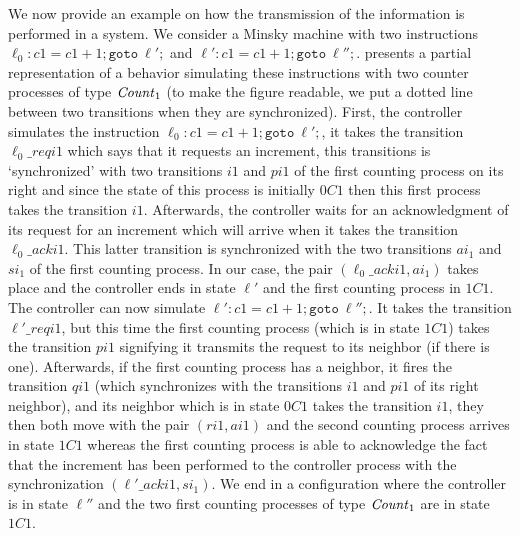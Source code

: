 We now provide an example on how the transmission of the information is performed in a system.
We consider a Minsky machine with two instructions
$\ell_0:c1=c1+1;\mathtt{goto}~\ell';$ and $\ell':c1=c1+1;\mathtt{goto}~\ell'';$.
 presents a partial representation of a behavior simulating these instructions
with two counter processes of type $\mathit{Count}_1$
(to make the figure readable, we put a dotted line between two transitions when they are synchronized).
First, the  controller simulates the instruction $\ell_0:c1=c1+1;\mathtt{goto}~\ell';$,
it takes the transition $\ell_0\_reqi1$ which says that it requests an increment,
this transitions is `synchronized' with two transitions $i1$ and $pi1$ of the first counting process
on its right and since the state of this process is initially $0C1$
then this first process takes the transition $i1$.
Afterwards, the controller waits for an acknowledgment of its request for an increment
which will arrive when it takes the transition $\ell_0\_acki1$.
This latter transition is synchronized with the two transitions $ai_1$ and $si_1$
of the first counting process.
In our case, the pair $(\ell_0\_acki1,ai_1)$ takes place and the controller ends in state $\ell'$
and the first counting process in $1C1$.
The controller can now simulate $\ell':c1=c1+1;\mathtt{goto}~\ell'';$.
It takes the transition $\ell'\_reqi1$, but this time the first counting process (which is in state $1C1$)
takes the transition $pi1$ signifying it transmits the request to its neighbor (if there is one).
Afterwards, if the first counting process has a neighbor, it  fires the transition $qi1$
(which synchronizes with the transitions $i1$ and $pi1$ of its right neighbor),
and its neighbor which is in state $0C1$ takes the transition $i1$,
they then both move with the pair $(ri1,ai1)$ and the second counting process arrives in state $1C1$
whereas the first counting process is able to acknowledge the fact that the increment has been performed
to the controller process with the synchronization $(\ell'\_acki1,si_1)$.
We end in a configuration where the controller is in state $\ell''$
and the two first counting processes of type $\mathit{Count}_1$ are in state $1C1$.




